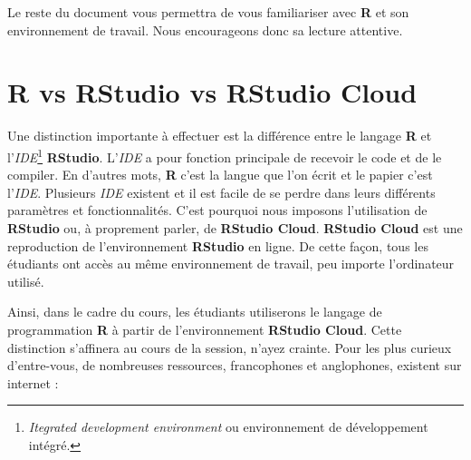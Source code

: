 \documentclass[10.5pt,a4paper]{article}
\begin{document}
Le reste du document vous permettra de vous familiariser avec \textbf{R} et son environnement de travail. Nous encourageons donc sa lecture attentive.

\section{R vs RStudio vs RStudio Cloud}\label{R vs RStudio vs RStudio Cloud}

Une distinction importante à effectuer est la différence entre le langage \textbf{R} et l'\textit{IDE}\footnote{\emph{Itegrated development environment} ou environnement de développement intégré.} \textbf{RStudio}. L'\textit{IDE} a pour fonction principale de recevoir le code et de le compiler. En d'autres mots, \textbf{R} c'est la langue que l'on écrit et le papier c'est l'\textit{IDE}. Plusieurs \textit{IDE} existent et il est facile de se perdre dans leurs différents paramètres et fonctionnalités. C'est pourquoi nous imposons l'utilisation de \textbf{RStudio} ou, à proprement parler, de \textbf{RStudio Cloud}. \textbf{RStudio Cloud} est une reproduction de l'environnement \textbf{RStudio} en ligne. De cette façon, tous les étudiants ont accès au même environnement de travail, peu importe l'ordinateur utilisé.  

Ainsi, dans le cadre du cours, les étudiants utiliserons le langage de programmation \textbf{R} à partir de l'environnement \textbf{RStudio Cloud}. Cette distinction s'affinera au cours de la session, n'ayez crainte. Pour les plus curieux d'entre-vous, de nombreuses ressources, francophones et anglophones, existent sur internet :
\end{document}
